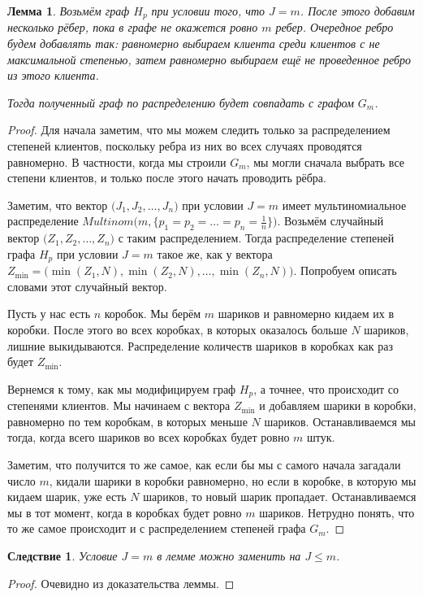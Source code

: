 \documentclass{matmex-diploma-custom}
\newcommand{\leqs}{\leqslant}
\newtheorem{cons}{Следствие}
\newtheorem{lemma}{Лемма}
\theoremstyle{named}
\begin{document}
\begin{lemma} \label{l2}
Возьмём граф $H_p$ при условии того, что $J = m$. 
После этого добавим несколько рёбер, пока в графе не окажется ровно $m$ ребер. 
Очередное ребро будем добавлять так: равномерно выбираем клиента среди клиентов с не максимальной степенью, 
затем равномерно выбираем ещё не проведенное ребро из этого клиента.

Тогда полученный граф по распределению будет совпадать с графом $G_m$.
\end{lemma}
\begin{proof}
Для начала заметим, что мы можем следить только за распределением степеней клиентов, 
поскольку ребра из них во всех случаях проводятся равномерно. В частности, когда мы строили $G_m$, 
мы могли сначала выбрать все степени клиентов, и только после этого начать проводить рёбра.

Заметим, что вектор $\big(J_1, J_2, \dots, J_n\big)$ при условии $J = m$ имеет мультиномиальное распределение 
$Multinom\big(m, \{p_1=p_2= \dots = p_n = \frac{1}{n} \}\big)$. 
Возьмём случайный вектор $\big(Z_1, Z_2, \dots, Z_n\big)$ с таким распределением.
Тогда распределение степеней графа $H_p$ при условии $J = m$ такое же,
как у вектора $Z_{\min} = \big(\min(Z_1, N), \min(Z_2, N), \dots, \min(Z_n, N)\big)$.
Попробуем описать словами этот случайный вектор.

Пусть у нас есть $n$ коробок. Мы берём $m$ шариков и равномерно кидаем их в коробки. 
После этого во всех коробках, в которых оказалось больше $N$ шариков, лишние выкидываются.
Распределение количеств шариков в коробках как раз будет $Z_{\min}$. 

Вернемся к тому, как мы модифицируем граф $H_p$, а точнее, что происходит со степенями клиентов. 
Мы начинаем с вектора $Z_{\min}$ и добавляем шарики в коробки, 
равномерно по тем коробкам, в которых меньше $N$ шариков. 
Останавливаемся мы тогда, когда всего шариков во всех коробках будет ровно $m$ штук.

Заметим, что получится то же самое, как если бы мы с самого начала загадали число $m$, кидали шарики в коробки равномерно, 
но если в коробке, в которую мы кидаем шарик, уже есть $N$ шариков, то новый шарик пропадает. 
Останавливаемся мы в тот момент, когда в коробках будет ровно $m$ шариков. 
Нетрудно понять, что то же самое происходит и с распределением степеней графа $G_m$.
\end{proof}

\smallskip

\begin{cons} \label{cons_1}
Условие $J = m$ в лемме можно заменить на $J \leqs m$.
\end{cons}
\begin{proof}
Очевидно из доказательства леммы.
\end{proof}
\end{document}
